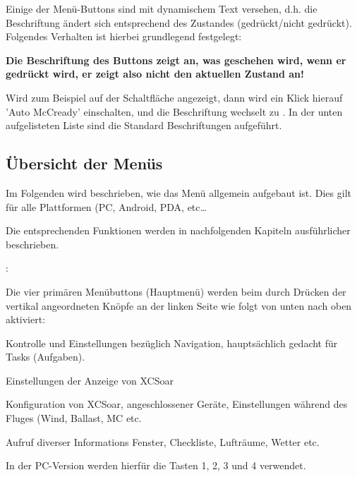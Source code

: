 Einige der Menü-Buttons sind mit dynamischem Text versehen, d.h. die Beschriftung ändert sich entsprechend des Zustandes (gedrückt/nicht gedrückt). Folgendes Verhalten ist hierbei grundlegend festgelegt:


\textbf{Die Beschriftung des Buttons zeigt an,\textcolor[rgb]{0.72,0.03,0.20}{ was geschehen wird}, wenn er \achtung gedrückt wird, er zeigt also nicht den aktuellen Zustand an!}

Wird zum Beispiel auf der Schaltfläche   angezeigt, dann wird ein Klick hierauf   'Auto
McCready' einschalten, und die Beschriftung wechselt zu  .
In der unten aufgelisteten Liste sind die Standard Beschriftungen aufgeführt.

\subsection*{Übersicht der Menüs}
Im Folgenden wird beschrieben, wie das Menü allgemein aufgebaut ist.
Dies gilt für alle Plattformen (\textsf{PC}, Android, \al PDA, etc\dots

Die entsprechenden Funktionen werden in nachfolgenden Kapiteln ausführlicher beschrieben.

\textsf{\al}:

Die vier primären Menübuttons (Hauptmenü) werden beim \al durch Drücken der vertikal angeordneten Knöpfe an der linken Seite wie folgt von unten nach oben aktiviert:

\begin{jspecs}
\item[\button{Nav}]      Kontrolle und Einstellungen bezüglich Navigation, hauptsächlich gedacht für Tasks (Aufgaben).
\item[\button{Anzeige}]  Einstellungen der Anzeige von \textsf{XCSoar}
\item[\button{Konfig.}]  Konfiguration von \textsf{XCSoar}, angeschlossener Geräte,
                                      Einstellungen während des Fluges (Wind, Ballast, MC etc.\
\item[\button{Info}]     Aufruf diverser Informations Fenster,  Checkliste, Lufträume, Wetter etc.\
\end{jspecs}

In der \textsf{\textsf{PC}}-Version werden hierfür die Tasten  1, 2, 3 und 4 verwendet.

